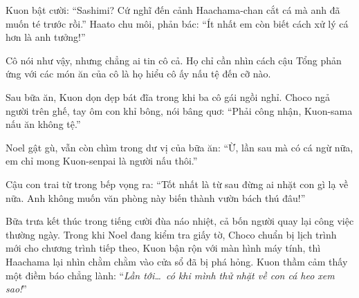 \documentclass[../main.tex]{subfiles}
\begin{document}
Kuon bật cười: ``Sashimi? Cứ nghĩ đến cảnh Haachama-chan cắt cá mà anh đã muốn té trước rồi.'' Haato chu môi, phản bác: ``Ít nhất em còn biết cách xử lý cá hơn là anh tưởng!''

Cô nói như vậy, nhưng chẳng ai tin cô cả. Họ chỉ cần nhìn cách cậu Tổng phản ứng với các món ăn của cô là họ hiểu cô ấy nấu tệ đến cỡ nào.

\ct

Sau bữa ăn, Kuon dọn dẹp bát đĩa trong khi ba cô gái ngồi nghỉ. Choco ngả người trên ghế, tay ôm con khỉ bông, nói bâng quơ: ``Phải công nhận, Kuon-sama nấu ăn không tệ.''

Noel gật gù, vẫn còn chìm trong dư vị của bữa ăn: ``Ừ, lần sau mà có cá ngừ nữa, em chỉ mong Kuon-senpai là người nấu thôi.''

Cậu con trai từ trong bếp vọng ra: ``Tốt nhất là từ sau đừng ai nhặt con gì lạ về nữa. Anh không muốn văn phòng này biến thành vườn bách thú đâu!''

Bữa trưa kết thúc trong tiếng cười đùa náo nhiệt, cả bốn người quay lại công việc thường ngày. Trong khi Noel đang kiểm tra giấy tờ, Choco chuẩn bị lịch trình mới cho chương trình tiếp theo, Kuon bận rộn với màn hình máy tính, thì Haachama lại nhìn chằm chằm vào cửa sổ đã bị phá hỏng. Kuon thầm cảm thấy một điềm báo chẳng lành: ``\textit{Lần tới\dots\ có khi mình thử nhặt về con cá heo xem sao!}''
\end{document}
